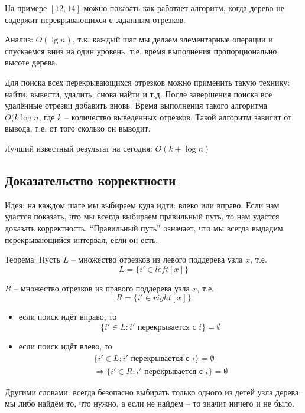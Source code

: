 \documentclass[a4paper,11pt]{article}
\begin{document}
На примере $[12, 14]$ можно показать как работает алгоритм, когда дерево не
содержит перекрывающихся с заданным отрезков.

Анализ: $O(\lg n)$, т.к. каждый шаг мы делаем элементарные операции и
спускаемся вниз на один уровень, т.е. время выполнения пропорционально высоте
дерева.

Для поиска всех перекрывающихся отрезков можно применить такую технику:
найти, вывести, удалить, снова найти и т.д. После завершения поиска все
удалённые отрезки добавить вновь. Время выполнения такого алгоритма $O(k
\log n$, где $k$ -- количество выведенных отрезков. Такой алгоритм зависит от
вывода, т.е. от того сколько он выводит.

Лучший известный результат на сегодня: $O(k + \log n)$

\subsection{Доказательство корректности}

Идея: на каждом шаге мы выбираем куда идти: влево или вправо. Если нам удастся
показать, что мы всегда выбираем правильный путь, то нам удастся доказать
корректность. ``Правильный путь'' означает, что мы всегда выдадим
перекрывающийся интервал, если он есть.

Теорема: Пусть $L$ -- множество отрезков из левого поддерева узла $x$, т.е.
$$
L = \lbrace i' \in left[x] \rbrace
$$

$R$ -- множество отрезков из правого поддерева узла $x$, т.е.
$$
R = \lbrace i' \in right[x] \rbrace
$$

\begin{itemize}
  
\item если поиск идёт вправо, то
  $$
  \lbrace i' \in L \colon i' \text{ перекрывается с } i\rbrace = \emptyset
  $$
  
\item если поиск идёт влево, то
  \begin{align*}
  \lbrace i' \in L \colon i' \text{ перекрывается с } i\rbrace = \emptyset \\
  \Rightarrow
  \lbrace i' \in R \colon i' \text{ перекрывается с } i\rbrace = \emptyset
  \end{align*}

\end{itemize}

Другими словами: всегда безопасно выбирать только одного из детей узла дерева: мы
либо найдём то, что нужно, а если не найдём -- то значит ничего и не было.
\end{document}
